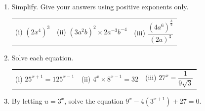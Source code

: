 \documentclass[12pt, twoside]{article}
\begin{document}
\begin{enumerate}[itemsep=0.15cm]
\begin{enumerate}[itemsep=0.15cm]
  \smallskip
  {\renewcommand{\arraystretch}{1.8}
  \begin{tabular}{|c|c|c|c|c|c|c|c|c|c|}
  \hline
  $32$ & $64$ & $81$ & $125$ & $\dfrac{1}{8}$ & $\dfrac{1}{9}$ & $\sqrt{5}$ & $4\sqrt{2}$ & $\dfrac{1}{5\sqrt{5}}$ & $\sqrt[3]{9}$ \\
  \hline
  \hspace{0.9cm} & \hspace{0.9cm} & \hspace{0.9cm} & \hspace{0.9cm} & \hspace{0.9cm} & \hspace{0.9cm} & \hspace{0.9cm} & \hspace{0.9cm} & \hspace{0.9cm} & \hspace{0.9cm} \\[0.4cm]
  \hline
  \end{tabular}}

  \item Simplify. Give your answers using positive exponents only.

  \begin{tabular}{@{}p{}p{}p{}}
  (i) $\left(2x^{4}\right)^{3}$ &
  (ii) $\left(3a^{2}b\right)^{2} \times 2a^{-3}b^{-4}$ &
  (iii) $\dfrac{\left(4a^{6}\right)^{\frac{3}{2}}}{\left(2a\right)^{3}}$
  \end{tabular}
  \vfill
  \item Solve each equation.

  \begin{tabular}{@{}p{}p{}p{}}
  (i) $25^{x + 1} = 125^{x - 1}$ & (ii) $4^{x} \times 8^{x - 1} = 32$ &
  (iii) $27^{x} = \dfrac{1}{9\sqrt{3}}$
  \end{tabular}
  \vfill
  \item By letting $u = 3^{x}$, solve the equation
  $9^{x} - 4\left(3^{x + 1}\right) + 27 = 0$. \vfill \vfill
\end{enumerate}

\end{enumerate}
\end{document}
